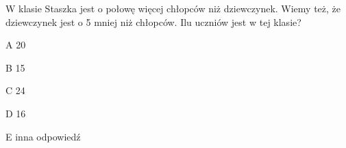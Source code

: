 \begin{tresc}
W klasie Staszka jest o połowę więcej chłopców niż dziewczynek. Wiemy też, że dziewczynek jest o 5 mniej niż chłopców. Ilu uczniów jest w tej klasie?
\end{tresc}
\begin{wariant}{A} 20 \end{wariant}
\begin{wariant}{B} 15 \end{wariant}
\begin{wariant}{C} 24 \end{wariant}
\begin{wariant}{D} 16 \end{wariant}
\begin{wariant}{E} inna odpowiedź \end{wariant}
